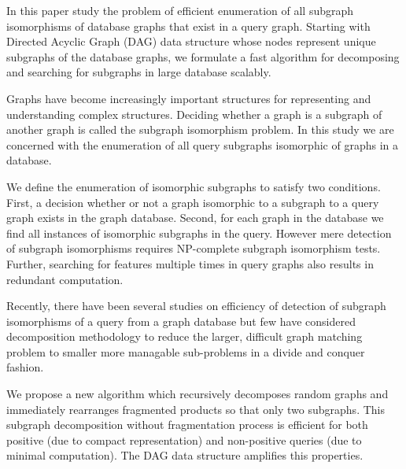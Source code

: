 
In this paper study the problem of efficient enumeration of all subgraph isomorphisms of database graphs that exist in a query graph. Starting with Directed Acyclic Graph (DAG) data structure whose nodes represent unique subgraphs of the database graphs, we formulate a fast algorithm for decomposing and searching for subgraphs in large database scalably.

Graphs have become increasingly important structures for representing and understanding complex structures. Deciding whether a graph is a subgraph of another graph is called the subgraph isomorphism problem. In this study we are concerned with the enumeration of all query subgraphs isomorphic of graphs in a database. 

We define the enumeration of isomorphic subgraphs to satisfy two conditions. First, a decision whether or not a graph isomorphic to a subgraph to a query graph exists in the graph database. Second, for each graph in the database we find all instances of isomorphic subgraphs in the query. 
However mere detection of subgraph isomorphisms requires NP-complete subgraph isomorphism tests. Further, searching for features multiple times in query graphs also results in redundant computation.

Recently, there have been several studies on efficiency of detection of subgraph isomorphisms of a query from a graph database but few have considered decomposition methodology to reduce the larger, difficult graph matching problem to smaller more managable sub-problems in a divide and conquer fashion. 


We propose a new algorithm which recursively decomposes random graphs and immediately rearranges fragmented products so that only two subgraphs. This subgraph decomposition without fragmentation process is efficient for both positive (due to compact representation) and non-positive queries (due to minimal computation). The DAG data structure amplifies this properties.

